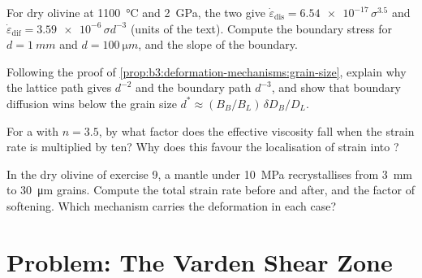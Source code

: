 \begin{exercise}[$\star\star$]\label{exo:b3:deformation-mechanisms:9}
For dry olivine at \qty{1100}{\celsius} and \qty{2}{GPa}, the two  give
$\dot\varepsilon_{\mathrm{dis}} = \num{6.54e-17}\,\sigma^{3.5}$ and
$\dot\varepsilon_{\mathrm{dif}} = \num{3.59e-6}\,\sigma d^{-3}$ (units of the
text). Compute the boundary stress for $d = \qty{1}{mm}$ and $d =
\qty{100}{\micro m}$, and the slope of the boundary.
\end{exercise}

\begin{exercise}[$\star\star\star$]\label{exo:b3:deformation-mechanisms:10}
Following the proof of \cref{prop:b3:deformation-mechanisms:grain-size},
explain why the lattice path gives $d^{-2}$ and the boundary path $d^{-3}$, and
show that boundary diffusion wins below the grain size $d^* \approx
(B_B/B_L)\,\delta D_B/D_L$.
\end{exercise}

\begin{exercise}[$\star\star\star$]\label{exo:b3:deformation-mechanisms:11}
For a  with $n = 3.5$, by what factor does the effective viscosity fall
when the strain rate is multiplied by ten? Why does this favour the
localisation of strain into ?
\end{exercise}

\begin{exercise}[$\star\star\star$]\label{exo:b3:deformation-mechanisms:12}
In the dry olivine of exercise 9, a mantle  under \qty{10}{MPa}
recrystallises from \qty{3}{mm} to \qty{30}{\micro m} grains. Compute the total
strain rate before and after, and the factor of softening. Which mechanism
carries the deformation in each case?
\end{exercise}

\section{Problem: The Varden Shear Zone}

